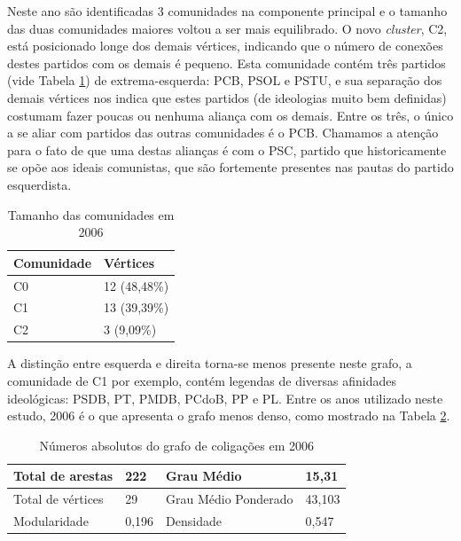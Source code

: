 Neste ano são identificadas 3 comunidades na componente principal e o tamanho das duas comunidades maiores voltou a ser mais equilibrado. O novo \emph{cluster}, C2, está posicionado longe dos demais vértices, indicando que o número de conexões destes partidos com  os demais é pequeno. Esta comunidade contém três partidos (vide Tabela \ref{table-2006a}) de extrema-esquerda: \gls{PCB}, \gls{PSOL} e \gls{PSTU}, e sua separação dos demais vértices nos indica que estes partidos (de ideologias muito bem definidas) costumam fazer poucas ou nenhuma aliança com os demais. Entre os três, o único a se aliar com partidos das outras comunidades é o \gls{PCB}. Chamamos a atenção para o fato de que uma destas alianças é com o \gls{PSC}, partido que historicamente se opõe aos ideais comunistas, que são fortemente presentes nas pautas do partido esquerdista.

\begin{table}[H]
\centering
\label{table-2006a}
\begin{tabular}{|l|l|}
\hline
Comunidade & Vértices \\ \hline
C0         &      12 (48,48\%)                \\ \hline
C1         &     13 (39,39\%)                \\ \hline
C2         &       3 (9,09\%)               \\ \hline
\end{tabular}
\caption{Tamanho das comunidades em 2006}
\end{table}

A distinção entre esquerda e direita torna-se menos presente neste grafo, a comunidade de C1 por exemplo, contém legendas de diversas afinidades ideológicas: \gls{PSDB}, \gls{PT}, \gls{PMDB}, \gls{PCdoB}, \gls{PP} e \gls{PL}. Entre os anos utilizado neste estudo, 2006 é o que apresenta o grafo menos denso, como mostrado na Tabela \ref{table-2006b}.

\begin{table}[H]
\centering
\label{table-2006b}
\begin{tabular}{|l|l|l|l|}
\hline
Total de arestas  & 222 & Grau Médio           & 15,31 \\ \hline
Total de vértices & 29 & Grau Médio Ponderado & 43,103 \\ \hline
Modularidade      & 0,196 & Densidade            & 0,547 \\ \hline
\end{tabular}
\caption{Números absolutos do grafo de coligações em 2006}
\end{table}

